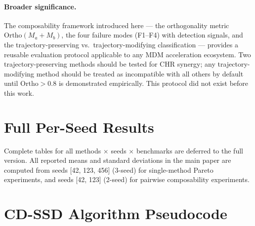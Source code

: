 \documentclass{article}
\newcommand{\ortho}{\text{Ortho}}
\begin{document}
\paragraph{Broader significance.} The composability framework introduced here --- the orthogonality
metric $\ortho(M_a + M_b)$, the four failure modes (F1--F4) with detection signals, and the
trajectory-preserving vs.\ trajectory-modifying classification --- provides a reusable evaluation
protocol applicable to any MDM acceleration ecosystem. Two trajectory-preserving methods should be
tested for CHR synergy; any trajectory-modifying method should be treated as incompatible with all
others by default until $\ortho > 0.8$ is demonstrated empirically. This protocol did not exist
before this work.




\appendix

\section{Full Per-Seed Results}
\label{appendix:seeds}

Complete tables for all methods $\times$ seeds $\times$ benchmarks are deferred to the full version.
All reported means and standard deviations in the main paper are computed from seeds [42, 123, 456]
(3-seed) for single-method Pareto experiments, and seeds [42, 123] (2-seed) for pairwise
composability experiments.

\section{CD-SSD Algorithm Pseudocode}
\label{appendix:cdssd}
\end{document}

